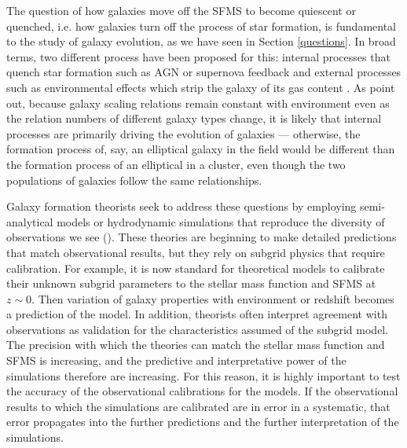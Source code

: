 
The question of how galaxies move off the SFMS to become quiescent or
quenched, i.e. how galaxies turn off the process of star formation, is
fundamental to the study of galaxy evolution, as we have seen in
Section \ref{questions}. In broad terms, two different process
have been proposed for this: internal processes that quench star
formation such as AGN or supernova feedback \citep{peng_mass_2010} and
external processes such as environmental effects which strip the
galaxy of its gas content \citep{peng_mass_2012,
  2012ApJ...757...85G}. As \citet{blanton_physical_2019-1} point out,
because galaxy scaling relations remain constant with environment even
as the relation numbers of different galaxy types change, it is likely
that internal processes are primarily driving the evolution of
galaxies --- otherwise, the formation process of, say, an elliptical
galaxy in the field would be different than the formation process of
an elliptical in a cluster, even though the two populations of
galaxies follow the same relationships. 

Galaxy formation theorists seek to address these questions by
employing semi-analytical models or hydrodynamic simulations that
reproduce the diversity of observations we see
(\citealt{somerville15a}). These theories are beginning to make
detailed predictions that match observational results, but they rely
on subgrid physics that require calibration. For example, it is now
standard for theoretical models to calibrate their unknown subgrid
parameters to the stellar mass function and SFMS at $z\sim 0$.  Then
variation of galaxy properties with environment or redshift becomes a
prediction of the model. In addition, theorists often interpret
agreement with observations as validation for the characteristics
assumed of the subgrid model.\\

The precision with which the theories can match the stellar mass
function and SFMS is increasing, and the predictive and interpretative
power of the simulations therefore are increasing. For this reason, it
is highly important to test the accuracy of the observational
calibrations for the models. If the observational results to which the
simulations are calibrated are in error in a systematic, that error
propagates into the further predictions and the further interpretation
of the simulations.\\

